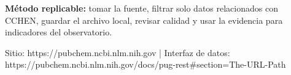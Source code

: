 \documentclass[9pt,a4paper]{extarticle}
\begin{document}
\vspace{0.06cm}
\begin{tcolorbox}[enhanced,colback=white,colframe=cchenpurple!55,boxrule=0.45pt,arc=2pt,left=6pt,right=6pt,top=5pt,bottom=5pt]
{\bfseries\color{cchenpurple}Método replicable:} tomar la fuente, filtrar solo datos relacionados con CCHEN, guardar el archivo local, revisar calidad y usar la evidencia para indicadores del observatorio.
\end{tcolorbox}

\vspace{0.02cm}
{\scriptsize\color{mutedgray}Sitio: https://pubchem.ncbi.nlm.nih.gov \quad | \quad Interfaz de datos: https://pubchem.ncbi.nlm.nih.gov/docs/pug-rest\#section=The-URL-Path}
\end{document}
